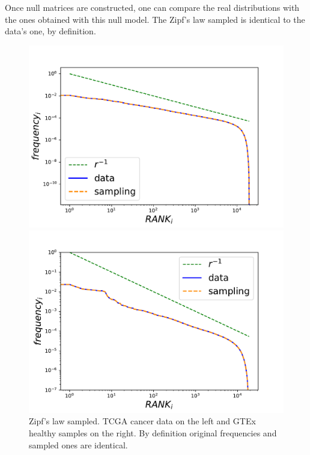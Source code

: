 Once null matrices are constructed, one can compare the real distributions with the ones obtained with this null model.
The Zipf's law sampled is identical to the data's one, by definition.
\begin{figure}[htb!]
\begin{minipage}{0.5\textwidth}
    \centering
    \includegraphics[width=0.95\linewidth]{pictures/structure/tcga/globalzipf_null.pdf}
\end{minipage}
\hspace{2mm}
\begin{minipage}{0.5\textwidth}
    \centering
    \includegraphics[width=0.95\linewidth]{pictures/structure/gtex/globalzipf_null.pdf}
\end{minipage}
\caption{Zipf's law sampled. TCGA cancer data on the left and GTEx healthy samples on the right. By definition original frequencies and sampled ones are identical.}
\label{fig:structure/globalzipf_null}
\end{figure}
